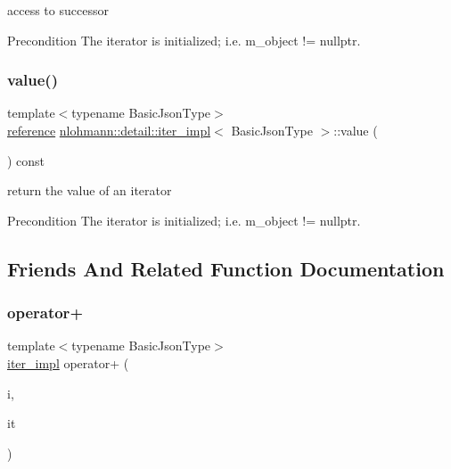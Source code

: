 access to successor 

\begin{DoxyPrecond}{Precondition}
The iterator is initialized; i.\+e. {\ttfamily m\+\_\+object != nullptr}. 
\end{DoxyPrecond}
\mbox{\label{classnlohmann_1_1detail_1_1iter__impl_ab447c50354c6611fa2ae0100ac17845c}} 
\subsubsection{\texorpdfstring{value()}{value()}}
{\footnotesize\ttfamily template$<$typename Basic\+Json\+Type$>$ \\
\hyperlink{classnlohmann_1_1detail_1_1iter__impl_a5be8001be099c6b82310f4d387b953ce}{reference} \hyperlink{classnlohmann_1_1detail_1_1iter__impl}{nlohmann\+::detail\+::iter\+\_\+impl}$<$ Basic\+Json\+Type $>$\+::value (\begin{DoxyParamCaption}{ }\end{DoxyParamCaption}) const\hspace{0.3cm}{\ttfamily [inline]}}



return the value of an iterator 

\begin{DoxyPrecond}{Precondition}
The iterator is initialized; i.\+e. {\ttfamily m\+\_\+object != nullptr}. 
\end{DoxyPrecond}


\subsection{Friends And Related Function Documentation}
\mbox{\label{classnlohmann_1_1detail_1_1iter__impl_a94108d1a7563e103534f23eb5c1ee175}} 
\subsubsection{\texorpdfstring{operator+}{operator+}}
{\footnotesize\ttfamily template$<$typename Basic\+Json\+Type$>$ \\
\hyperlink{classnlohmann_1_1detail_1_1iter__impl}{iter\+\_\+impl} operator+ (\begin{DoxyParamCaption}\item[{\hyperlink{classnlohmann_1_1detail_1_1iter__impl_a2f7ea9f7022850809c60fc3263775840}{difference\+\_\+type}}]{i,  }\item[{const \hyperlink{classnlohmann_1_1detail_1_1iter__impl}{iter\+\_\+impl}$<$ Basic\+Json\+Type $>$ \&}]{it }\end{DoxyParamCaption})\hspace{0.3cm}{\ttfamily [friend]}}



